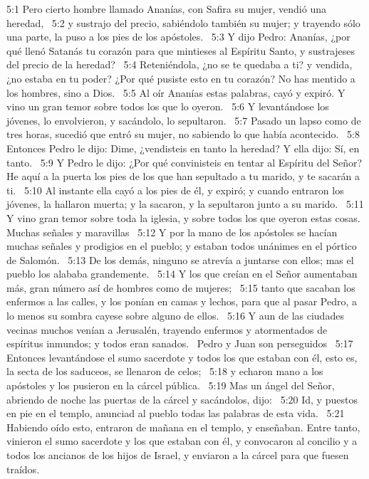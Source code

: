 5:1 Pero cierto hombre llamado Ananías, con Safira su mujer, vendió una heredad,  
5:2 y sustrajo del precio, sabiéndolo también su mujer; y trayendo sólo una parte, la puso a los pies de los apóstoles.  
5:3 Y dijo Pedro: Ananías, ¿por qué llenó Satanás tu corazón para que mintieses al Espíritu Santo, y sustrajeses del precio de la heredad?  
5:4 Reteniéndola, ¿no se te quedaba a ti? y vendida, ¿no estaba en tu poder? ¿Por qué pusiste esto en tu corazón? No has mentido a los hombres, sino a Dios.  
5:5 Al oír Ananías estas palabras, cayó y expiró. Y vino un gran temor sobre todos los que lo oyeron.  
5:6 Y levantándose los jóvenes, lo envolvieron, y sacándolo, lo sepultaron.  
5:7 Pasado un lapso como de tres horas, sucedió que entró su mujer, no sabiendo lo que había acontecido.  
5:8 Entonces Pedro le dijo: Dime, ¿vendisteis en tanto la heredad? Y ella dijo: Sí, en tanto.  
5:9 Y Pedro le dijo: ¿Por qué convinisteis en tentar al Espíritu del Señor? He aquí a la puerta los pies de los que han sepultado a tu marido, y te sacarán a ti.  
5:10 Al instante ella cayó a los pies de él, y expiró; y cuando entraron los jóvenes, la hallaron muerta; y la sacaron, y la sepultaron junto a su marido.  
5:11 Y vino gran temor sobre toda la iglesia, y sobre todos los que oyeron estas cosas.  
Muchas señales y maravillas  
5:12 Y por la mano de los apóstoles se hacían muchas señales y prodigios en el pueblo; y estaban todos unánimes en el pórtico de Salomón.  
5:13 De los demás, ninguno se atrevía a juntarse con ellos; mas el pueblo los alababa grandemente.  
5:14 Y los que creían en el Señor aumentaban más, gran número así de hombres como de mujeres;  
5:15 tanto que sacaban los enfermos a las calles, y los ponían en camas y lechos, para que al pasar Pedro, a lo menos su sombra cayese sobre alguno de ellos.  
5:16 Y aun de las ciudades vecinas muchos venían a Jerusalén, trayendo enfermos y atormentados de espíritus inmundos; y todos eran sanados.  
Pedro y Juan son perseguidos  
5:17 Entonces levantándose el sumo sacerdote y todos los que estaban con él, esto es, la secta de los saduceos, se llenaron de celos;  
5:18 y echaron mano a los apóstoles y los pusieron en la cárcel pública.  
5:19 Mas un ángel del Señor, abriendo de noche las puertas de la cárcel y sacándolos, dijo:  
5:20 Id, y puestos en pie en el templo, anunciad al pueblo todas las palabras de esta vida.  
5:21 Habiendo oído esto, entraron de mañana en el templo, y enseñaban. Entre tanto, vinieron el sumo sacerdote y los que estaban con él, y convocaron al concilio y a todos los ancianos de los hijos de Israel, y enviaron a la cárcel para que fuesen traídos.  

